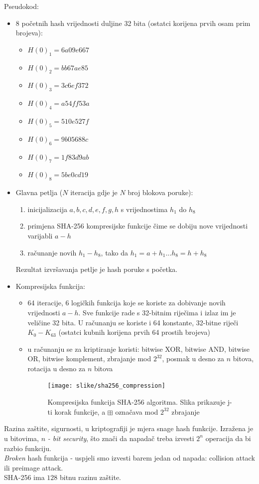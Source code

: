 \documentclass[12pt]{article}
\begin{document}
Pseudokod:
\begin{itemize}
	\item 8 početnih hash vrijednosti duljine 32 bita (ostatci korijena prvih osam prim brojeva):
	\begin{itemize}
		\item $H(0)_1 = 6a09e667$
		\item $H(0)_2 = bb67ae85$
		\item $H(0)_3 = 3c6ef372$
		\item $H(0)_4 = a54ff53a$
		\item $H(0)_5 = 510e527f$
		\item $H(0)_6 = 9b05688c$
		\item $H(0)_7 = 1f83d9ab$
		\item $H(0)_8 = 5be0cd19$
	\end{itemize}
	\item Glavna petlja ($N$ iteracija gdje je $N$ broj blokova poruke):
	\begin{enumerate}
		\item inicijalizacija $a, b, c, d, e, f, g, h$ s vrijednostima $h_1$ do $h_8$
		\item primjena SHA-256 kompresijske funkcije čime se dobiju nove vrijednosti varijabli $a - h$
		\item računanje novih $h_1 - h_8$, tako da $h_1 = a + h_1 . . . h_8 = h + h_8$
	\end{enumerate}
	Rezultat izvršavanja petlje je hash poruke s početka.
	\item Kompresijska funkcija:
	\begin{itemize}
		\item 64 iteracije, 6 logičkih funkcija koje se koriste za dobivanje novih vrijednosti $a - h$. Sve funkcije rade s 32-bitnim riječima i izlaz im je veličine 32 bita. U računanju se koriste i 64 konstante, 32-bitne riječi $K_0-K_{63}$ (ostatci kubnih korijena prvih 64 prostih brojeva)
		\item u računanju se za kriptiranje koristi: bitwise XOR, bitwise AND, bitwise OR, bitwise komplement, zbrajanje mod $2^{32}$, posmak u desno za $n$ bitova, rotacija u desno za $n$ bitova\cite{sha-description}
		\begin{figure}[h!]
			\centering
			\texttt{[image: slike/sha256\_compression]}
			\caption{Kompresijska funkcija SHA-256 algoritma. Slika prikazuje j-ti korak funkcije, a $\boxplus$ označava mod $2^{32}$ zbrajanje}
		\end{figure}
	\end{itemize}
\end{itemize}
Razina zaštite, sigurnosti, u kriptografiji je mjera snage hash funkcije. Izražena je u bitovima, $n$ \textit{- bit security}, što znači da napadač treba izvesti $2^n$ operacija da bi razbio funkciju.\\ \textit{Broken} hash funkcija - uspjeli smo izvesti barem jedan od napada: collision attack ili preimage attack. \\ 
SHA-256 ima $128$ bitnu razinu zaštite.
\end{document}
